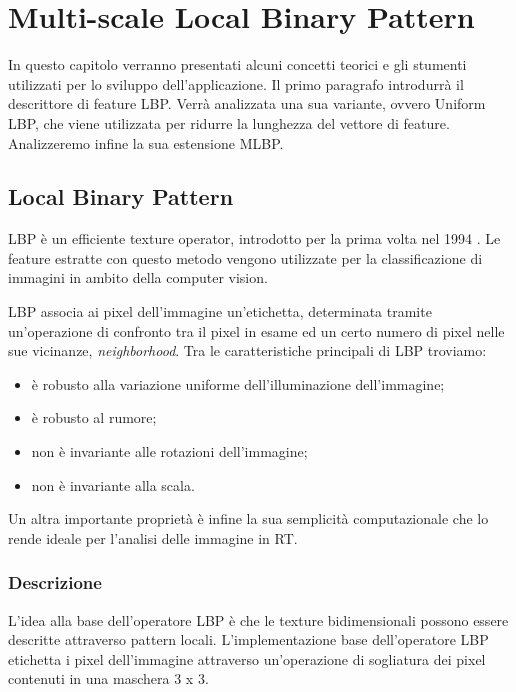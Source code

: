 \section{Multi-scale Local Binary Pattern}
In questo capitolo verranno presentati alcuni concetti teorici e gli stumenti utilizzati per lo sviluppo dell'applicazione. Il primo paragrafo introdurrà il descrittore di feature \acf{LBP}. Verrà analizzata una sua variante, ovvero Uniform LBP, che viene utilizzata per ridurre la lunghezza del vettore di feature. Analizzeremo infine la sua estensione \acf{MLBP}.

\subsection{Local Binary Pattern}

\acf{LBP} è un efficiente texture operator, introdotto per la prima volta nel 1994 \cite{LBPfirst}. Le feature estratte con questo metodo vengono utilizzate per la classificazione di immagini in ambito della computer vision.

\acs{LBP} associa ai pixel dell'immagine un'etichetta, determinata tramite un'operazione di confronto tra il pixel in esame ed un certo numero di pixel nelle sue vicinanze, \emph{neighborhood}.
Tra le caratteristiche principali di \acs{LBP} troviamo:

\begin{itemize}
	\item è robusto alla variazione uniforme dell'illuminazione dell'immagine;
	\item è robusto al rumore;
	\item non è invariante alle rotazioni dell'immagine;
	\item non è invariante alla scala.
\end{itemize}

Un altra importante proprietà è infine la sua semplicità computazionale che lo rende ideale per l'analisi delle immagine in \acf{RT}.

\subsubsection{Descrizione}

L'idea alla base dell'operatore \acf{LBP} è che le texture bidimensionali possono essere descritte attraverso pattern locali.
L'implementazione base dell'operatore \acs{LBP} etichetta i pixel dell'immagine attraverso un'operazione di sogliatura dei pixel contenuti in una maschera 3 x 3.

